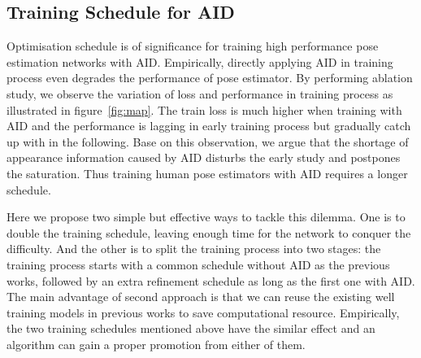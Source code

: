 \documentclass[final]{cvpr}
\begin{document}
\subsection{Training Schedule for AID}
Optimisation schedule is of significance for training high performance pose estimation networks with AID. Empirically, directly applying AID in training process even degrades the performance of pose estimator. By performing ablation study, we observe the variation of loss and performance in training process as illustrated in figure~\ref{fig:map}. The train loss is much higher when training with AID and the performance is lagging in early training process but gradually catch up with in the following. Base on this observation, we argue that the shortage of appearance information caused by AID disturbs the early study and postpones the saturation. Thus training human pose estimators with AID requires a longer schedule.

Here we propose two simple but effective ways to tackle this dilemma. One is to double the training schedule, leaving enough time for the network to conquer the difficulty. And the other is to split the training process into two stages: the training process starts with a common schedule without AID as the previous works, followed by an extra refinement schedule as long as the first one with AID. The main advantage of second approach is that we can reuse the existing well training models in previous works to save computational resource. Empirically, the two training schedules mentioned above have the similar effect and an algorithm can gain a proper promotion from either of them.
\end{document}
